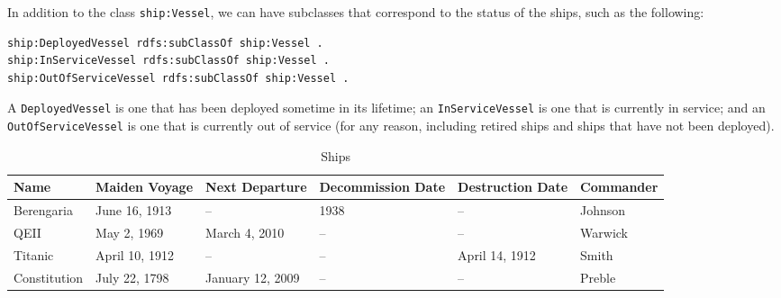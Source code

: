 In addition to the class \texttt{ship:Vessel}, we can have subclasses that
correspond to the status of the ships, such as the following:

\begin{lstlisting}
ship:DeployedVessel rdfs:subClassOf ship:Vessel .
ship:InServiceVessel rdfs:subClassOf ship:Vessel .
ship:OutOfServiceVessel rdfs:subClassOf ship:Vessel .
\end{lstlisting}

A \texttt{DeployedVessel} is one that has been deployed sometime in its lifetime;
an \texttt{InServiceVessel} is one that is currently in service; and an
\texttt{OutOfServiceVessel} is one that is currently out of service (for any
reason, including retired ships and ships that have not been deployed).

\begin{table}

\begin{tabular}{|llllll|}
\hline
Name&Maiden Voyage&Next Departure&Decommission Date&Destruction Date&Commander\\
\hline
Berengaria&June 16, 1913&--&1938&--&Johnson\\
QEII&May 2, 1969&March 4, 2010&--&--&Warwick\\
Titanic&April 10, 1912&--&--&April 14, 1912&Smith\\
Constitution&July 22, 1798&January 12, 2009&--&--&Preble\\
\hline
\end{tabular}
\caption{Ships\label{tab:ch8.1}}
\end{table}

